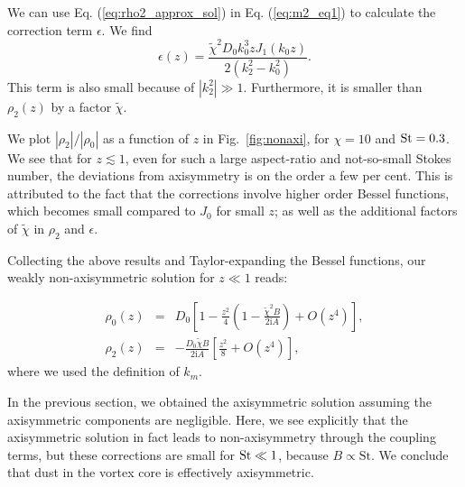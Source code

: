 \documentclass[apj]{emulateapj}
\newcommand{\Eq}[1]{Eq. (\ref{#1})}
\newcommand{\eq}[1]{\Eq{#1}}
\newcommand{\Fig}[1]{Fig.~\ref{#1}}
\newcommand{\fig}[1]{\Fig{#1}}
\newcommand{\beq}{\begin{equation}}
\newcommand{\eeq}{\end{equation}}
\newcommand{\beqn}{\begin{eqnarray}}
\newcommand{\eeqn}{\end{eqnarray}}
\begin{document}
 
We can use \eq{eq:rho2_approx_sol} in \eq{eq:m2_eq1} to
calculate the correction term $\epsilon$. We find 
\beq
\epsilon(z) = \frac{\tilde{\chi}^2D_0k_0^3zJ_1(k_0z)}{2\left(k_2^2 -
  k_0^2\right)}. 
\eeq
This term is also small because of $|k_2^2|\gg1$. Furthermore, it is
smaller than $\rho_2(z)$ by a factor $\tilde{\chi}$.  

We plot $|\rho_2|/|\rho_0|$ as a function of $z$ in \fig{fig:nonaxi}, 
for $\chi=10$ and $\rm{St}=0.3$. We see that for $z\lesssim 1$, even 
for such a large aspect-ratio and not-so-small Stokes number, the
deviations from axisymmetry is on the order a few per cent. This is attributed to the fact
that the corrections involve higher order Bessel functions, which
becomes small compared to $J_0$ for small $z$; as well as the
additional factors of $\tilde{\chi}$ in $\rho_2$ and $\epsilon$.   

Collecting the above results and Taylor-expanding the Bessel functions, our
weakly non-axisymmetric solution for $z\ll 1$ reads:


\beqn
\rho_0(z) &=& D_0\left[1 -
  \frac{z^2}{4}\left(1-\frac{\tilde{\chi}^2B}{2\mathrm{i}A}\right)
+ O(z^4)\right],\\
\rho_2(z) &=&
-\frac{D_0\tilde{\chi}B}{2\mathrm{i}A}\left[\frac{z^2}{8}+O(z^4)\right],  
\eeqn 
where we used the definition of $k_m$. 

In the previous section, we obtained the axisymmetric solution
assuming the axisymmetric components are negligible. Here, we 
see explicitly that the axisymmetric solution in fact leads to
non-axisymmetry through the coupling terms, but these corrections are
small for $\rm{St}\ll1$, because $B\propto\mathrm{St}$. 
We conclude that dust in the vortex core is effectively axisymmetric.   
\end{document}
